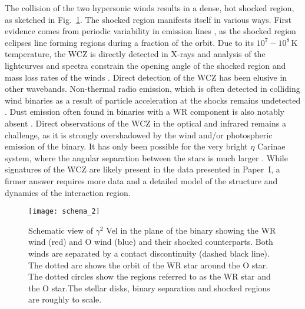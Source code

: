 \documentclass[usenatbib]{mnras}%
\begin{document}
The collision of the two hypersonic winds results in a dense, hot shocked region, as sketched in Fig.~\ref{fig:schema}. The shocked region manifests itself in various ways. First evidence comes from periodic variability in  emission lines \citep{1993ApJ...415..298S}, as the shocked region eclipses line forming regions during a fraction of the orbit.  Due to its $10^7-10^8$\,K temperature, the WCZ is directly detected in X-rays and analysis of the lightcurves and spectra constrain the opening angle of the shocked region and mass loss rates of the winds \citep{1995A&A...298..549W,1996MNRAS.283..589S,2000MNRAS.316..129R,2004A&A...422..177S}. Direct detection of the WCZ has been elusive in other wavebands.  Non-thermal radio emission, which is often detected in colliding wind binaries as a result of particle acceleration at the shocks remains undetected \citep{1990MNRAS.244..101W}. Dust emission often found in binaries with a WR component \citep[WC9 subtypes, see e.g. WR 104 in][]{2008ApJ...675..698T} is also notably absent \citep{2002ASPC..260..331M}. Direct observations of the WCZ in the optical and infrared remains a challenge, as it is strongly overshadowed by the wind and/or photospheric emission of the binary. It has only been possible for the very bright $\eta$ Carinae system, where the angular separation between the stars is much larger \citep{2016A&A...594A.106W}. While signatures of the WCZ are likely present in the data presented in Paper~I, a firmer answer requires more data and a detailed model of the structure and dynamics of the interaction region. 

 \begin{figure}
   \centering
 \texttt{[image: schema\_2]}
  \caption{Schematic view of $\gamma^2$ Vel in the plane of the binary showing the WR wind (red) and O wind (blue) and their shocked counterparts. Both winds are separated by a contact discontinuity (dashed black line). The dotted arc shows the orbit of the WR star around the O star. The dotted circles show the regions referred to as the WR star and the O star.The stellar disks, binary separation and shocked regions are roughly to scale.} 
  \label{fig:schema}
 \end{figure}
\end{document}
